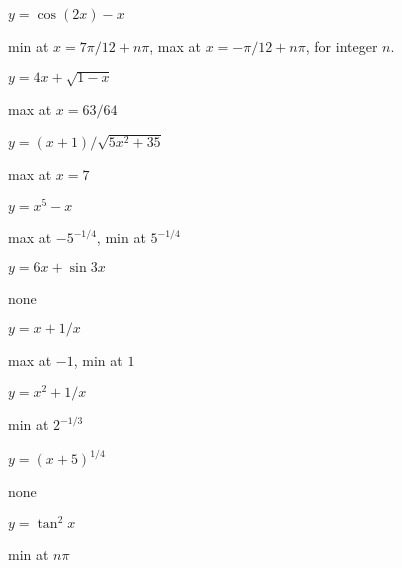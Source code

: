 \begin{exercises}
\begin{exercise} $y=\cos(2x)-x$ 
\begin{answer} min at $x=7\pi/12+n\pi$, max at $x=-\pi/12+n\pi$, for integer $n$.
\end{answer}\end{exercise}

\begin{exercise} $y = 4x+\sqrt{1-x}$
\begin{answer} max at $x=63/64$
\end{answer}\end{exercise}

\begin{exercise} $y = (x+1)/\sqrt{5x^2 + 35}$
\begin{answer} max at $x=7$
\end{answer}\end{exercise}

\begin{exercise} $y= x^5 - x$
\begin{answer} max at $-5^{-1/4}$, min at $5^{-1/4}$
\end{answer}\end{exercise}

\begin{exercise} $y = 6x +\sin 3x$
\begin{answer} none
\end{answer}\end{exercise}

\begin{exercise} $y = x+ 1/x$
\begin{answer} max at $-1$, min at $1$
\end{answer}\end{exercise}

\begin{exercise} $y = x^2+ 1/x$
\begin{answer} min at $2^{-1/3}$
\end{answer}\end{exercise}

\begin{exercise} $y = (x+5)^{1/4}$
\begin{answer} none
\end{answer}\end{exercise}

\begin{exercise} $y = \tan^2 x$
\begin{answer} min at $n\pi$
\end{answer}\end{exercise}


\end{exercises}
